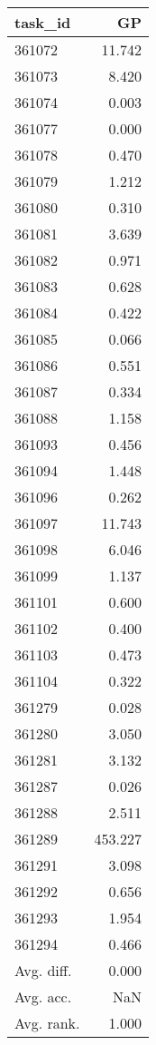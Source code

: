 \begin{tabular}{lr}
\toprule
task\_id & GP \\
\midrule
361072 & 11.742 \\
361073 & 8.420 \\
361074 & 0.003 \\
361077 & 0.000 \\
361078 & 0.470 \\
361079 & 1.212 \\
361080 & 0.310 \\
361081 & 3.639 \\
361082 & 0.971 \\
361083 & 0.628 \\
361084 & 0.422 \\
361085 & 0.066 \\
361086 & 0.551 \\
361087 & 0.334 \\
361088 & 1.158 \\
361093 & 0.456 \\
361094 & 1.448 \\
361096 & 0.262 \\
361097 & 11.743 \\
361098 & 6.046 \\
361099 & 1.137 \\
361101 & 0.600 \\
361102 & 0.400 \\
361103 & 0.473 \\
361104 & 0.322 \\
361279 & 0.028 \\
361280 & 3.050 \\
361281 & 3.132 \\
361287 & 0.026 \\
361288 & 2.511 \\
361289 & 453.227 \\
361291 & 3.098 \\
361292 & 0.656 \\
361293 & 1.954 \\
361294 & 0.466 \\
Avg. diff. & 0.000 \\
Avg. acc. & NaN \\
Avg. rank. & 1.000 \\
\bottomrule
\end{tabular}

